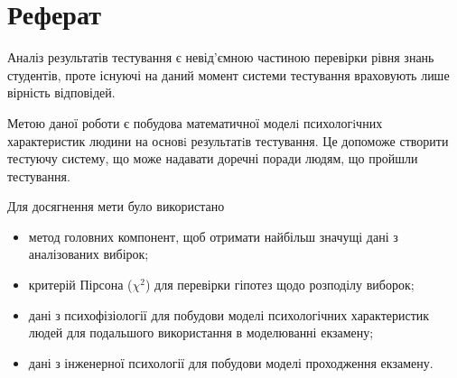 \chapter*{Реферат}

Аналіз результатів тестування є невід’ємною частиною перевірки рівня знань
студентів, проте існуючі на даний момент системи тестування враховують
лише вірність відповідей.

Метою даної роботи є побудова математичної моделi психологiчних характеристик
людини на основi результатiв тестування.
Це допоможе створити тестуючу систему, що може надавати доречні поради людям,
що пройшли тестування.

Для досягнення мети було використано
\begin{itemize}
  \item 
    метод головних компонент, щоб отримати найбільш значущі дані з аналізованих
    вибірок;
  \item
    критерій Пірсона ($\chi^2$) для перевірки гіпотез щодо розподілу виборок;
  \item
    дані з психофізіології для побудови моделі психологічних характеристик
    людей для подальшого використання в моделюванні екзамену;
  \item
    дані з інженерної психології для побудови моделі проходження екзамену.
\end{itemize}
